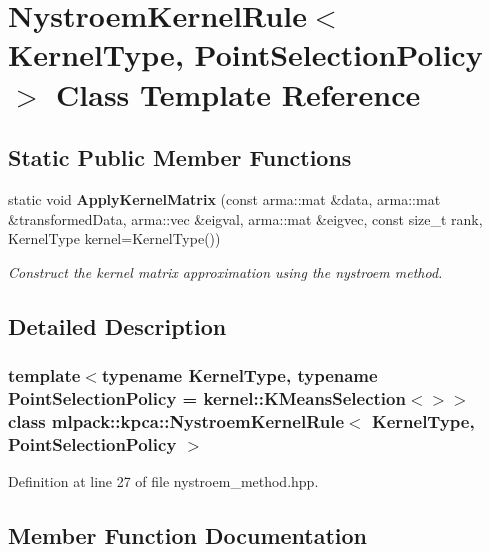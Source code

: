 \section{Nystroem\+Kernel\+Rule$<$ Kernel\+Type, Point\+Selection\+Policy $>$ Class Template Reference}
\label{classmlpack_1_1kpca_1_1NystroemKernelRule}
\subsection*{Static Public Member Functions}
\begin{DoxyCompactItemize}
\item 
static void \textbf{ Apply\+Kernel\+Matrix} (const arma\+::mat \&data, arma\+::mat \&transformed\+Data, arma\+::vec \&eigval, arma\+::mat \&eigvec, const size\+\_\+t rank, Kernel\+Type kernel=Kernel\+Type())
\begin{DoxyCompactList}\small\item\em Construct the kernel matrix approximation using the nystroem method. \end{DoxyCompactList}\end{DoxyCompactItemize}


\subsection{Detailed Description}
\subsubsection*{template$<$typename Kernel\+Type, typename Point\+Selection\+Policy = kernel\+::\+K\+Means\+Selection$<$$>$$>$\newline
class mlpack\+::kpca\+::\+Nystroem\+Kernel\+Rule$<$ Kernel\+Type, Point\+Selection\+Policy $>$}



Definition at line 27 of file nystroem\+\_\+method.\+hpp.



\subsection{Member Function Documentation}
\mbox{\label{classmlpack_1_1kpca_1_1NystroemKernelRule_a9043568ae7d441d997df28a9963c2c39}} 
